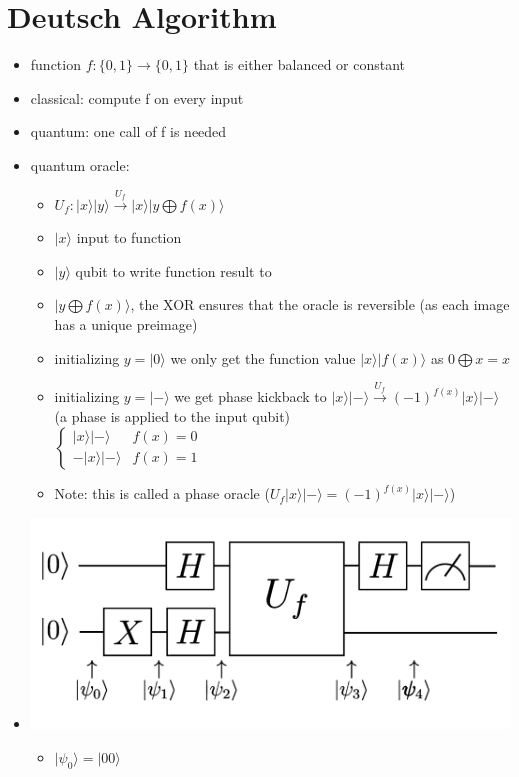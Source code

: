 \documentclass[12pt,a4paper]{article}
\newcommand{\ecb}[1]{\{#1\}}
\newcommand{\ket}[1]{\vert #1 \rangle}
\begin{document}
\section{Deutsch Algorithm}
\begin{itemize}
\item function $f : \ecb{0,1}\rightarrow \ecb{0,1}$ that is either balanced or constant
\item classical: compute f on every input
\item quantum: one call of f is needed
\item quantum oracle:
\begin{itemize}
\item $U_f : \ket{x}\ket{y} \xrightarrow{U_f} \ket{x}\ket{y\bigoplus f(x)}$
\item $\ket{x}$ input to function
\item $\ket{y}$ qubit to write function result to
\item $\ket{y\bigoplus f(x)}$, the XOR ensures that the oracle is reversible (as each image has a unique preimage)
\item initializing $y = \ket{0}$ we only get the function value $\ket{x}\ket{f(x)}$ as $0\bigoplus x = x$
\item initializing $y = \ket{-}$ we get phase kickback to $\ket{x}\ket{-} \xrightarrow{U_f} (-1)^{f(x)} \ket{x}\ket{-}$ (a phase is applied to the input qubit)\\$\begin{cases} \ket{x}\ket{-} & f(x)=0 \\ -\ket{x}\ket{-} & f(x)=1 \end{cases}$
\item Note: this is called a phase oracle ($U_f \ket{x}\ket{-} = (-1)^{f(x)}\ket{x}\ket{-}$)
\end{itemize}
\item \includegraphics[scale=0.2]{./resources/deutschplan.png}
\begin{itemize}
\item $\ket{\psi_0} = \ket{00}$

\end{itemize}
\end{itemize}
\end{document}
